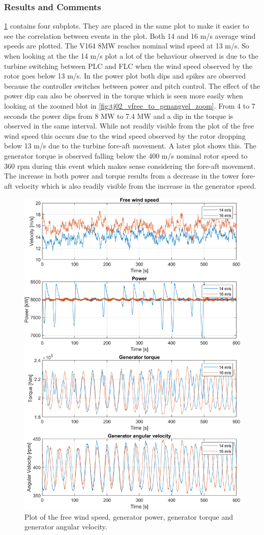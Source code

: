 \subsubsection*{Results and Comments}
\cref{fig:tj02_vfree_to_genangvel} contains four subplots. They are placed in the same plot to make it easier to see the correlation between events in the plot. Both 14 and 16 m/s average wind speeds are plotted. The V164 8MW reaches nominal wind speed at 13 m/s. So when looking at the the 14 m/s plot a lot of the behaviour observed is due to the turbine switching between PLC and FLC when the wind speed observed by the rotor goes below 13 m/s. In the power plot both dips and spikes are observed because the controller switches between power and pitch control. The effect of the power dip can also be observed in the torque which is seen more easily when looking at the zoomed blot in \cref{fig:tj02_vfree_to_genangvel_zoom}. From 4 to 7 seconds the power dips from 8 MW to 7.4 MW and a dip in the torque is observed in the same interval. While not readily visible from the plot of the free wind speed this occurs due to the wind speed observed by the rotor dropping below 13 m/s due to the turbine fore-aft movement. A later plot shows this. The generator torque is observed falling below the 400 m/s nominal rotor speed to 360 rpm during this event which makes sense considering the fore-aft movement. The increase in both power and torque results from a decrease in the tower fore-aft velocity which is also readily visible from the increase in the generator speed.
\begin{figure}[ht]
	\centering
	\includegraphics[width=0.8\linewidth]{Graphics/TestResults/tj02/vhfree_power_genmom_omgen.png}
	\caption{Plot of the free wind speed, generator power, generator torque and generator angular velocity.}
	\label{fig:tj02_vfree_to_genangvel}
\end{figure}
